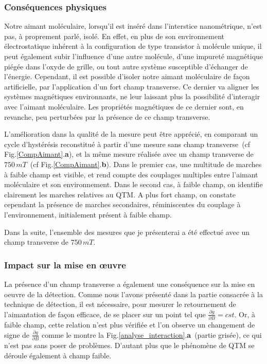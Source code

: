 \subsubsection{Conséquences physiques}
Notre aimant moléculaire, lorsqu'il est inséré dans l'interstice nanométrique, n'est pas, à proprement parlé, isolé. En effet, en plus de son environnement électrostatique inhérent à la configuration de type transistor à molécule unique, il peut également subir l'influence d'une autre molécule, d'une impureté magnétique piégée dans l'oxyde de grille, ou tout autre système susceptible d'échanger de l'énergie. Cependant, il est possible d'isoler notre aimant moléculaire de façon artificielle, par l'application d'un fort champ transverse. Ce dernier va aligner les systèmes magnétiques environnants, ne leur laissant plus la possibilité d'interagir avec l'aimant moléculaire. Les propriétés magnétiques de ce dernier sont, en revanche, peu perturbées par la présence de ce champ transverse.

L'amélioration dans la qualité de la mesure peut être apprécié, en comparant un cycle d'hystérésis reconstitué à partir d'une mesure sans champ transverse~(cf Fig.\ref{CompAimant}.\textbf{a}), et la même mesure réalisée avec un champ transverse de $750\,mT$~(cf Fig.\ref{CompAimant}.\textbf{b}). Dans le premier cas, une multitude de marches à faible champ est visible, et rend compte des couplages multiples entre l'aimant moléculaire et son environnement. Dans le second cas, à faible champ, on identifie clairement les marches relatives au QTM. A plus fort champ, on constate cependant la présence de marches secondaires, réminiscentes du couplage à l'environnement, initialement présent à faible champ.

Dans la suite, l'ensemble des mesures que je présenterai a été effectué avec un champ transverse de $750\,mT$.

\subsubsection{Impact sur la mise en œuvre}

La présence d'un champ transverse a également une conséquence sur la mise en oeuvre de la détection. Comme nous l'avons présenté dans la partie consacrée à la technique de détection, il est nécessaire, pour mesurer le retournement de l'aimantation de façon efficace, de se placer sur un point tel que $\frac{\partial g}{\partial B} = cst$. Or, à faible champ, cette relation n'est plus vérifiée et l'on observe un changement de signe de $\frac{\partial g}{\partial B}$  comme le montre la Fig.\ref{analyse_interaction}.\textbf{a}~(partie grisée), ce qui n'est pas sans poser de problèmes. D'autant plus que le phénomène de QTM se déroule également à champ faible.

